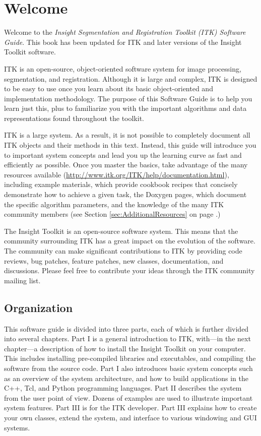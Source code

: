\chapter{Welcome}
\label{chapter:Introduction}

Welcome to the \emph{Insight Segmentation and Registration Toolkit (ITK)
Software Guide}. This book has been updated for ITK \ITKVERSIONMAJORMINOR
and later versions of the Insight Toolkit software.

ITK is an open-source, object-oriented software system for image processing,
segmentation, and registration.  Although it is large and complex, ITK is
designed to be easy to use once you learn about its basic object-oriented and
implementation methodology. The purpose of this Software Guide is
to help you learn just this, plus to familiarize you with the important
algorithms and data representations found throughout the toolkit.

ITK is a large system. As a result, it is not possible to completely document
all ITK objects and their methods in this text. Instead, this guide will
introduce you to important system concepts and lead you up the learning curve
as fast and efficiently as possible. Once you master the basics, take
advantage of the many resources available
(\url{http://www.itk.org/ITK/help/documentation.html}), including example
materials, which provide cookbook recipes that concisely demonstrate how to
achieve a given task, the Doxygen pages, which document the specific algorithm
parameters, and the knowledge of the many ITK community members (see Section
\ref{sec:AdditionalResources} on page \pageref{sec:AdditionalResources}.)

The Insight Toolkit is an open-source software system. This means that the
community surrounding ITK has a great impact on the evolution of the software.
The community can make significant contributions to ITK by providing code
reviews, bug patches, feature patches, new classes, documentation, and
discussions. Please feel free to contribute your ideas through the ITK
community mailing list.

\section{Organization}
\label{sec:Organization}

This software guide is divided into three parts, each of which is further
divided into several chapters. Part I is a general introduction to ITK,
with---in the next chapter---a description of how to install the Insight
Toolkit on your computer. This includes installing pre-compiled libraries and
executables, and compiling the software from the source code. Part I also
introduces basic system concepts such as an overview of the system
architecture, and how to build applications in the C++, Tcl, and Python programming
languages. Part II describes the system from the user point of view. Dozens
of examples are used to illustrate important system features. Part III is for
the ITK developer. Part III explains how to create your own classes, extend
the system, and interface to various windowing and GUI systems.

